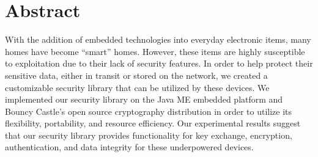 \section{Abstract}

With the addition of embedded technologies into everyday electronic items, many homes have become ``smart'' homes. However, these items are highly susceptible to exploitation due to their lack of security features. In order to help protect their sensitive data, either in transit or stored on the network, we created a customizable security library that can be utilized by these devices. We implemented our security library on the Java ME embedded platform and Bouncy Castle's open source cryptography distribution  in order to utilize its flexibility, portability, and resource efficiency. Our experimental results suggest that our security library provides functionality for key exchange, encryption, authentication, and data integrity for these underpowered devices.